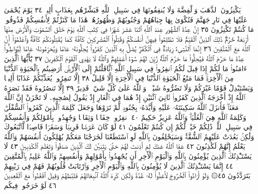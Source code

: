 يَكْنِزُونَ ٱلذَّهَبَ وَٱلْفِضَّةَ وَلَا يُنفِقُونَهَا فِي
سَبِيلِ ٱللَّهِ فَبَشِّرْهُم بِعَذَابٍ أَلِيمࣲ ٣٤ يَوْمَ يُحْمَىٰ عَلَيْهَا
فِي نَارِ جَهَنَّمَ فَتُكْوَىٰ بِهَا جِبَاهُهُمْ وَجُنُوبُهُمْ
وَظُهُورُهُمْۖ هَٰذَا مَا كَنَزْتُمْ لِأَنفُسِكُمْ فَذُوقُوا۟ مَا كُنتُمْ
تَكْنِزُونَ ٣٥ إِنَّ عِدَّةَ ٱلشُّهُورِ عِندَ ٱللَّهِ ٱثْنَا عَشَرَ
شَهْرࣰا فِي كِتَٰبِ ٱللَّهِ يَوْمَ خَلَقَ ٱلسَّمَٰوَٰتِ وَٱلْأَرْضَ مِنْهَآ
أَرْبَعَةٌ حُرُمࣱۚ ذَٰلِكَ ٱلدِّينُ ٱلْقَيِّمُۚ فَلَا تَظْلِمُوا۟ فِيهِنَّ
أَنفُسَكُمْۚ وَقَٰتِلُوا۟ ٱلْمُشْرِكِينَ كَآفَّةࣰ كَمَا
يُقَٰتِلُونَكُمْ كَآفَّةࣰۚ وَٱعْلَمُوٓا۟ أَنَّ ٱللَّهَ مَعَ ٱلْمُتَّقِينَ ٣٦
إِنَّمَا ٱلنَّسِيٓءُ زِيَادَةࣱ فِي ٱلْكُفْرِۖ يُضَلُّ بِهِ ٱلَّذِينَ
كَفَرُوا۟ يُحِلُّونَهُۥ عَامࣰا وَيُحَرِّمُونَهُۥ عَامࣰا لِّيُوَاطِـُٔوا۟
عِدَّةَ مَا حَرَّمَ ٱللَّهُ فَيُحِلُّوا۟ مَا حَرَّمَ ٱللَّهُۚ زُيِّنَ لَهُمْ
سُوٓءُ أَعْمَٰلِهِمْۗ وَٱللَّهُ لَا يَهْدِي ٱلْقَوْمَ ٱلْكَٰفِرِينَ ٣٧
يَٰٓأَيُّهَا ٱلَّذِينَ ءَامَنُوا۟ مَا لَكُمْ إِذَا قِيلَ لَكُمُ
ٱنفِرُوا۟ فِي سَبِيلِ ٱللَّهِ ٱثَّاقَلْتُمْ إِلَى ٱلْأَرْضِۚ أَرَضِيتُم
بِٱلْحَيَوٰةِ ٱلدُّنْيَا مِنَ ٱلْأٓخِرَةِۚ فَمَا مَتَٰعُ ٱلْحَيَوٰةِ
ٱلدُّنْيَا فِي ٱلْأٓخِرَةِ إِلَّا قَلِيلٌ ٣٨ إِلَّا تَنفِرُوا۟ يُعَذِّبْكُمْ
عَذَابًا أَلِيمࣰا وَيَسْتَبْدِلْ قَوْمًا غَيْرَكُمْ وَلَا تَضُرُّوهُ
شَيْـࣰٔاۗ وَٱللَّهُ عَلَىٰ كُلِّ شَيْءࣲ قَدِيرٌ ٣٩ إِلَّا تَنصُرُوهُ
فَقَدْ نَصَرَهُ ٱللَّهُ إِذْ أَخْرَجَهُ ٱلَّذِينَ كَفَرُوا۟ ثَانِيَ ٱثْنَيْنِ
إِذْ هُمَا فِي ٱلْغَارِ إِذْ يَقُولُ لِصَٰحِبِهِۦ لَا تَحْزَنْ إِنَّ ٱللَّهَ
مَعَنَاۖ فَأَنزَلَ ٱللَّهُ سَكِينَتَهُۥ عَلَيْهِ وَأَيَّدَهُۥ بِجُنُودࣲ
لَّمْ تَرَوْهَا وَجَعَلَ كَلِمَةَ ٱلَّذِينَ كَفَرُوا۟ ٱلسُّفْلَىٰۗ
وَكَلِمَةُ ٱللَّهِ هِيَ ٱلْعُلْيَاۗ وَٱللَّهُ عَزِيزٌ حَكِيمٌ ٤٠
ٱنفِرُوا۟ خِفَافࣰا وَثِقَالࣰا وَجَٰهِدُوا۟ بِأَمْوَٰلِكُمْ وَأَنفُسِكُمْ
فِي سَبِيلِ ٱللَّهِۚ ذَٰلِكُمْ خَيْرࣱ لَّكُمْ إِن كُنتُمْ تَعْلَمُونَ ٤١
لَوْ كَانَ عَرَضࣰا قَرِيبࣰا وَسَفَرࣰا قَاصِدࣰا لَّٱتَّبَعُوكَ
وَلَٰكِنۢ بَعُدَتْ عَلَيْهِمُ ٱلشُّقَّةُۚ وَسَيَحْلِفُونَ بِٱللَّهِ
لَوِ ٱسْتَطَعْنَا لَخَرَجْنَا مَعَكُمْ يُهْلِكُونَ أَنفُسَهُمْ وَٱللَّهُ
يَعْلَمُ إِنَّهُمْ لَكَٰذِبُونَ ٤٢ عَفَا ٱللَّهُ عَنكَ لِمَ أَذِنتَ لَهُمْ
حَتَّىٰ يَتَبَيَّنَ لَكَ ٱلَّذِينَ صَدَقُوا۟ وَتَعْلَمَ ٱلْكَٰذِبِينَ ٤٣
لَا يَسْتَـْٔذِنُكَ ٱلَّذِينَ يُؤْمِنُونَ بِٱللَّهِ وَٱلْيَوْمِ ٱلْأٓخِرِ أَن
يُجَٰهِدُوا۟ بِأَمْوَٰلِهِمْ وَأَنفُسِهِمْۗ وَٱللَّهُ عَلِيمُۢ بِٱلْمُتَّقِينَ ٤٤
إِنَّمَا يَسْتَـْٔذِنُكَ ٱلَّذِينَ لَا يُؤْمِنُونَ بِٱللَّهِ وَٱلْيَوْمِ ٱلْأٓخِرِ
وَٱرْتَابَتْ قُلُوبُهُمْ فَهُمْ فِي رَيْبِهِمْ يَتَرَدَّدُونَ ٤٥۞ وَلَوْ
أَرَادُوا۟ ٱلْخُرُوجَ لَأَعَدُّوا۟ لَهُۥ عُدَّةࣰ وَلَٰكِن كَرِهَ ٱللَّهُ ٱنۢبِعَاثَهُمْ
فَثَبَّطَهُمْ وَقِيلَ ٱقْعُدُوا۟ مَعَ ٱلْقَٰعِدِينَ ٤٦ لَوْ خَرَجُوا۟ فِيكُم
